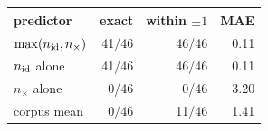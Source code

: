 \begin{tabular}{lrrr}
\toprule
predictor & exact & within $\pm1$ & MAE \\
\midrule
$\max(n_{\rm id}, n_\times)$ & 41/46 & 46/46 & 0.11 \\
$n_{\rm id}$ alone & 41/46 & 46/46 & 0.11 \\
$n_\times$ alone & 0/46 & 0/46 & 3.20 \\
corpus mean & 0/46 & 11/46 & 1.41 \\
\bottomrule
\end{tabular}